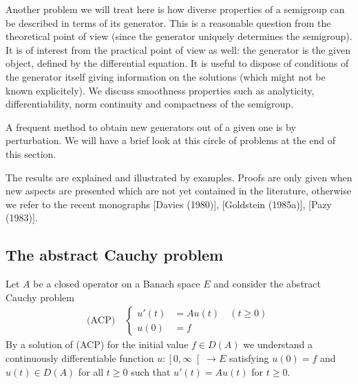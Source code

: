 Another problem we will treat here is how diverse properties of a semigroup can be described in terms of its generator.
This is a reasonable question from the theoretical point of view (since the generator uniquely determines the semigroup).
It is of interest from the practical point of view as well: the generator is the given object, defined by the differential equation.
It is useful to dispose of conditions of the generator itself giving information on the solutions (which might not be known explicitely).
We discuss smoothness properties such as analyticity, differentiability, norm continuity and compactness of the semigroup.

A frequent method to obtain new generators out of a given one is by perturbation.
We will have a brief look at this circle of problems at the end of this section.

The results are explained and illustrated by examples.
Proofs are only given when new aspects are presented which are not yet contained in the literature, otherwise we refer to the recent monographs [Davies (1980)], [Goldstein (1985a)], [Pazy (1983)].
\subsection{The abstract Cauchy problem} \label{subsec:a2-1.se1}
Let $A$ be a closed operator on a Banach space $E$ and consider the abstract Cauchy problem
\begin{align*}
\text{(ACP)} \quad \begin{cases}
    u'(t) &= Au(t) \quad (t \geq 0) \\
    u(0) &= f
\end{cases}
\end{align*}
By a solution of (ACP) for the initial value $f \in D(A)$ we understand a continuously differentiable function $u \colon \left[0,\infty\right[ \to E$ satisfying $u(0) = f$ and $u(t) \in D(A)$ for all $t \geq 0$ such that $u'(t) = Au(t)$ for $t \geq 0$.

